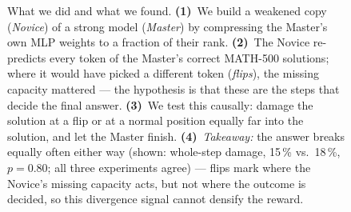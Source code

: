 \begin{figure}[t]
\begin{tikzpicture}
\end{tikzpicture}
\caption{What we did and what we found.
\textbf{(1)}~We build a weakened copy (\emph{Novice}) of a strong model
(\emph{Master}) by compressing the Master's own MLP weights to a fraction of
their rank. \textbf{(2)}~The Novice re-predicts every token of the Master's
correct MATH-500 solutions; where it would have picked a different token
(\emph{flips}), the missing capacity mattered --- the hypothesis is that these
are the steps that decide the final answer. \textbf{(3)}~We test this causally:
damage the solution at a flip or at a normal position equally far into the
solution, and let the Master finish. \textbf{(4)}~\emph{Takeaway:} the answer
breaks equally often either way (shown: whole-step damage, 15\,\% vs.\ 18\,\%,
$p=0.80$; all three experiments agree) --- flips mark where the Novice's
missing capacity acts, but not where the outcome is decided, so this divergence
signal cannot densify the reward.}
\label{fig:overview}
\end{figure}


